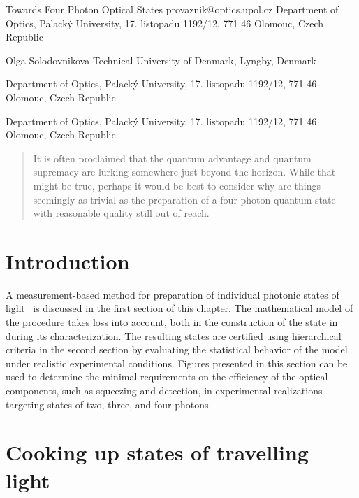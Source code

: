 \documentclass{article}
\begin{document}
\ArticleTitle
  {Towards Four Photon Optical States}
  {provaznik@optics.upol.cz}
\ArticleAuthorAddress
  {Department of Optics, Palack\'{y} University, 17. listopadu 1192/12, 771 46 Olomouc, Czech Republic}

\ArticleAuthor
  {Olga Solodovnikova}
\ArticleAuthorAddress
  {Technical University of Denmark, Lyngby, Denmark}

\ArticleAuthorAddress
  {Department of Optics, Palack\'{y} University, 17. listopadu 1192/12, 771 46 Olomouc, Czech Republic}

\ArticleAuthorAddress
  {Department of Optics, Palack\'{y} University, 17. listopadu 1192/12, 771 46 Olomouc, Czech Republic}

\ArticleTitlePrint

\begin{abstract}\noindent
  It is often proclaimed that the quantum advantage and quantum supremacy are lurking somewhere just beyond the horizon. While that might be true, perhaps it would be best to consider why are things seemingly as trivial as the preparation of a four photon quantum state with reasonable quality still out of reach.
\end{abstract}

%
%

\section{Introduction}

A measurement-based method for preparation of individual photonic states of light~\cite{yukawa2013a,yoshikawa2018,tiedau2019} is discussed in the first section of this chapter. The mathematical model of the procedure takes loss into account, both in the construction of the state in during its characterization. The resulting states are certified using hierarchical criteria \cite{lachman2019} in the second section by evaluating the statistical behavior of the model under realistic experimental conditions. Figures presented in this section can be used to determine the minimal requirements on the efficiency of the optical components, such as squeezing and detection, in experimental realizations targeting states of two, three, and four photons.

%
%

\section{Cooking up states of travelling light}
\end{document}
